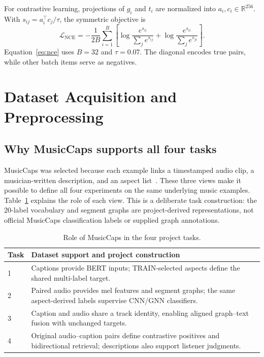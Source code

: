 \documentclass[conference]{IEEEtran}
\begin{document}
For contrastive learning, projections of $g_i$ and $t_i$ are normalized into $a_i,c_i\in\mathbb R^{256}$. With $s_{ij}=a_i^\top c_j/\tau$, the symmetric objective is
\begin{equation}
\mathcal L_{\mathrm{NCE}}=-\frac1{2B}\sum_{i=1}^{B}\left[\log\frac{e^{s_{ii}}}{\sum_j e^{s_{ij}}}+\log\frac{e^{s_{ii}}}{\sum_j e^{s_{ji}}}\right].
\label{eq:nce}
\end{equation}
Equation~\eqref{eq:nce} uses $B=32$ and $\tau=0.07$. The diagonal encodes true pairs, while other batch items serve as negatives.

\section{Dataset Acquisition and Preprocessing}\label{sec:data}
\subsection{Why MusicCaps supports all four tasks}
MusicCaps was selected because each example links a timestamped audio clip, a musician-written description, and an aspect list~\cite{musiccaps,musiclm}. These three views make it possible to define all four experiments on the same underlying music examples. Table~\ref{tab:taskdata} explains the role of each view. This is a deliberate task construction: the 20-label vocabulary and segment graphs are project-derived representations, not official MusicCaps classification labels or supplied graph annotations.
\begin{table}[t]\centering\small
\caption{Role of MusicCaps in the four project tasks.}\label{tab:taskdata}
\begin{tabular}{@{}p{.13\linewidth}p{.79\linewidth}@{}}\toprule
Task & Dataset support and project construction\\\midrule
1 & Captions provide BERT inputs; TRAIN-selected aspects define the shared multi-label target.\\
2 & Paired audio provides mel features and segment graphs; the same aspect-derived labels supervise CNN/GNN classifiers.\\
3 & Caption and audio share a track identity, enabling aligned graph--text fusion with unchanged targets.\\
4 & Original audio--caption pairs define contrastive positives and bidirectional retrieval; descriptions also support listener judgments.\\\bottomrule
\end{tabular}
\end{table}
\end{document}
